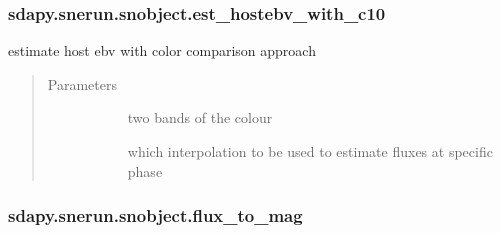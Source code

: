 \documentclass[letterpaper,10pt,english]{sphinxmanual}
\begin{document}
\begin{fulllineitems}
\begin{fulllineitems}
\end{fulllineitems}



\subsubsection{sdapy.snerun.snobject.est\_hostebv\_with\_c10}
\label{\detokenize{generated/sdapy.snerun.snobject.est_hostebv_with_c10:sdapy-snerun-snobject-est-hostebv-with-c10}}\label{\detokenize{generated/sdapy.snerun.snobject.est_hostebv_with_c10::doc}}

\begin{fulllineitems}
\label{\detokenize{generated/sdapy.snerun.snobject.est_hostebv_with_c10:sdapy.snerun.snobject.est_hostebv_with_c10}}
estimate host ebv with color comparison approach
\begin{quote}\begin{description}
\item[{Parameters}] \leavevmode\begin{description}
\item[{}] \leavevmode{[}\sphinxtitleref{list}{]}
two bands of the colour

\item[{}] \leavevmode{[}\sphinxtitleref{str}{]}
which interpolation to be used to estimate fluxes at specific phase

\end{description}

\end{description}\end{quote}

\end{fulllineitems}



\subsubsection{sdapy.snerun.snobject.flux\_to\_mag}
\label{\detokenize{generated/sdapy.snerun.snobject.flux_to_mag:sdapy-snerun-snobject-flux-to-mag}}\label{\detokenize{generated/sdapy.snerun.snobject.flux_to_mag::doc}}


\end{fulllineitems}
\end{document}
